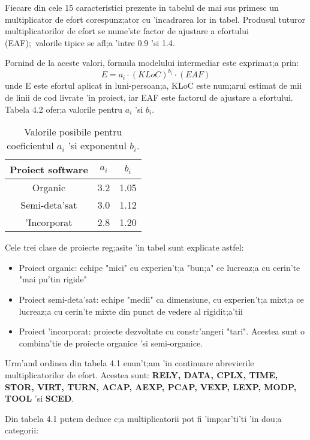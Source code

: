 Fiecare din cele 15 caracteristici prezente in tabelul de mai sus primesc un multiplicator de efort corespunz;ator cu 'incadrarea lor in tabel. Produsul tuturor multiplicatorilor de efort se nume'ste factor de ajustare a efortului (EAF);\ valorile tipice se afl;a 'intre 0.9 'si 1.4.
\par
Pornind de la aceste valori, formula modelului intermediar este exprimat;a prin:
\begin{equation}
E = a_{i} \cdot (KLoC)^{b_{i}} \cdot (EAF)
\end{equation}
unde E este efortul aplicat in luni-persoan;a, KLoC este num;arul estimat de mii de linii de cod livrate 'in proiect, iar EAF este factorul de ajustare a efortului. Tabela 4.2 ofer;a valorile pentru $a_{i}$ 'si $b_{i}$.
\begin{table}[!htbp]
\begin{center}
\begin{tabular}{| c | c | c |}
\hline
Proiect software & $a_{i}$ & $b_{i}$ \\ \hline \hline
Organic & 3.2 & 1.05 \\ \hline
Semi-deta'sat & 3.0 & 1.12 \\ \hline
'Incorporat & 2.8 & 1.20 \\ \hline
\end{tabular}
\caption{Valorile posibile pentru coeficientul $a_{i}$ 'si exponentul $b_{i}$.}
\end{center}
\end{table}
\par
Cele trei clase de proiecte reg;asite 'in tabel sunt explicate astfel:
\begin{itemize}
\item Proiect organic: echipe "mici" cu experien't;a "bun;a" ce lucreaz;a cu cerin'te "mai pu'tin rigide"
\item Proiect semi-deta'sat: echipe "medii" ca dimensiune, cu experien't;a mixt;a ce lucreaz;a cu cerin'te mixte din punct de vedere al rigidit;a'tii
\item Proiect 'incorporat: proiecte dezvoltate cu constr'angeri "tari". Acestea sunt o combina'tie de proiecte organice 'si semi-organice.
\end{itemize}
\par
Urm'and ordinea din tabela 4.1 enun't;am 'in continuare abrevierile multiplicatorilor de efort. Acestea sunt: \textbf{RELY, DATA, CPLX, TIME, STOR, VIRT, TURN, ACAP, AEXP, PCAP, VEXP, LEXP, MODP, TOOL} 'si \textbf{SCED}.
\par
Din tabela 4.1 putem deduce c;a multiplicatorii pot fi 'imp;ar'ti'ti 'in dou;a categorii:
